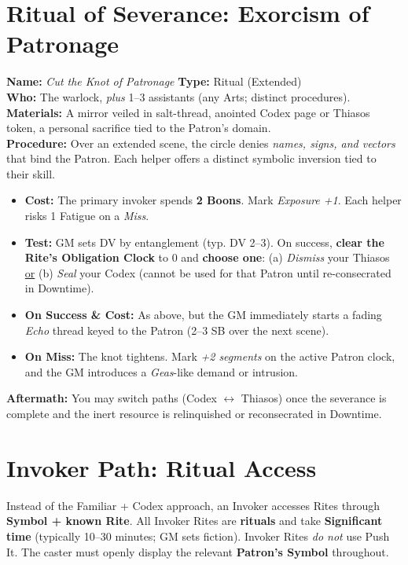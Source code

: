 \documentclass[12pt,twoside]{book}
\begin{document}
\section{Ritual of Severance: Exorcism of Patronage}
\label{subsec:exorcism}
\textbf{Name:} \emph{Cut the Knot of Patronage} \quad \textbf{Type:} Ritual (Extended) \\
\textbf{Who:} The warlock, \emph{plus} 1--3 assistants (any Arts; distinct procedures). \\
\textbf{Materials:} A mirror veiled in salt-thread, anointed Codex page or Thiasos token, a personal sacrifice tied to the Patron's domain. \\
\textbf{Procedure:} Over an extended scene, the circle denies \emph{names, signs, and vectors} that bind the Patron. Each helper offers a distinct symbolic inversion tied to their skill.
\begin{itemize}
  \item \textbf{Cost:} The primary invoker spends \textbf{2 Boons}. Mark \emph{Exposure +1}. Each helper risks 1 Fatigue on a \emph{Miss}.
  \item \textbf{Test:} GM sets DV by entanglement (typ. DV 2–3). On success, \textbf{clear the Rite's Obligation Clock} to 0 and \textbf{choose one}: (a) \emph{Dismiss} your Thiasos \underline{or} (b) \emph{Seal} your Codex (cannot be used for that Patron until re-consecrated in Downtime).
  \item \textbf{On Success \& Cost:} As above, but the GM immediately starts a fading \emph{Echo} thread keyed to the Patron (2–3 SB over the next scene).
  \item \textbf{On Miss:} The knot tightens. Mark \emph{+2 segments} on the active Patron clock, and the GM introduces a \emph{Geas}-like demand or intrusion.
\end{itemize}
\textbf{Aftermath:} You may switch paths (Codex $\leftrightarrow$ Thiasos) once the severance is complete and the inert resource is relinquished or reconsecrated in Downtime.


\section*{Invoker Path: Ritual Access}

Instead of the Familiar + Codex approach, an Invoker accesses Rites through \textbf{Symbol + known Rite}. All Invoker Rites are \textbf{rituals} and take \textbf{Significant time} (typically 10–30 minutes; GM sets fiction). Invoker Rites \emph{do not} use Push It. The caster must openly display the relevant \textbf{Patron's Symbol} throughout.
\end{document}

